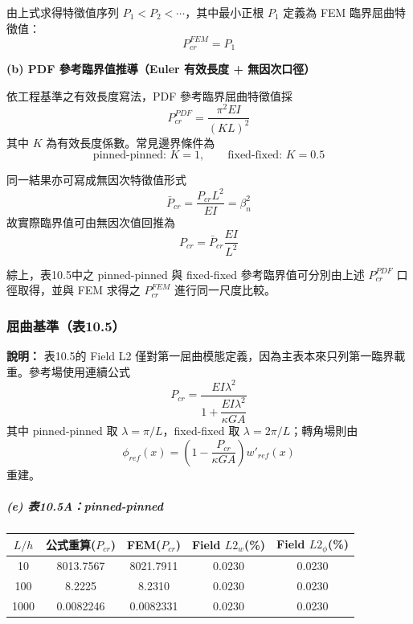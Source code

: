 ﻿\documentclass[UTF8, a4paper, 12pt]{ctexart}
\begin{document}
由上式求得特徵值序列 $P_1<P_2<\cdots$，其中最小正根 $P_1$ 定義為 FEM 臨界屈曲特徵值：
\begin{equation}
  P_{cr}^{FEM}=P_1
\end{equation}

\textbf{(b) PDF 參考臨界值推導（Euler 有效長度 + 無因次口徑）}

依工程基準之有效長度寫法，PDF 參考臨界屈曲特徵值採
\begin{equation}
  P_{cr}^{PDF}=\frac{\pi^2 EI}{(K L)^2}
\end{equation}
其中 $K$ 為有效長度係數。常見邊界條件為
\begin{equation}
  \text{pinned-pinned: }K=1,\qquad
  \text{fixed-fixed: }K=0.5
\end{equation}

同一結果亦可寫成無因次特徵值形式
\begin{equation}
  \bar{P}_{cr}=\frac{P_{cr}L^2}{EI}=\beta_n^2
\end{equation}
故實際臨界值可由無因次值回推為
\begin{equation}
  P_{cr}=\bar{P}_{cr}\frac{EI}{L^2}
\end{equation}

綜上，表10.5中之 pinned-pinned 與 fixed-fixed 參考臨界值可分別由上述
$P_{cr}^{PDF}$ 口徑取得，並與 FEM 求得之 $P_{cr}^{FEM}$ 進行同一尺度比較。

\subsubsection{屈曲基準（表10.5）}

\textbf{說明：} 表10.5的 Field L2 僅對第一屈曲模態定義，因為主表本來只列第一臨界載重。參考場使用連續公式
\begin{equation}
  P_{cr}=\frac{EI\lambda^2}{1+\dfrac{EI\lambda^2}{\kappa GA}}
\end{equation}
其中 pinned-pinned 取 $\lambda=\pi/L$，fixed-fixed 取 $\lambda=2\pi/L$；轉角場則由
\begin{equation}
  \phi_{ref}(x)=\left(1-\frac{P_{cr}}{\kappa GA}\right)w'_{ref}(x)
\end{equation}
重建。

\subparagraph{(e) 表10.5A：pinned-pinned}

\begin{center}
\begin{tabular}{ccccc}
\toprule
\textbf{$L/h$} & \textbf{公式重算($P_{cr}$)} & \textbf{FEM($P_{cr}$)} & \textbf{Field $L2_w$(\%)} & \textbf{Field $L2_\phi$(\%)} \\
\midrule
10   & 8013.7567 & 8021.7911 & 0.0230 & 0.0230 \\
100  & 8.2225    & 8.2310    & 0.0230 & 0.0230 \\
1000 & 0.0082246 & 0.0082331 & 0.0230 & 0.0230 \\
\bottomrule
\end{tabular}
\end{center}
\end{document}
